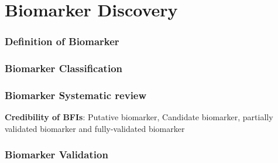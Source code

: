\section{Biomarker Discovery}
\subsubsection{Definition of Biomarker}


\subsubsection{Biomarker Classification}


\subsubsection{Biomarker Systematic review}
\textbf{Credibility of BFIs}: Putative biomarker, Candidate biomarker, partially validated biomarker and fully-validated biomarker

\subsubsection{Biomarker Validation}